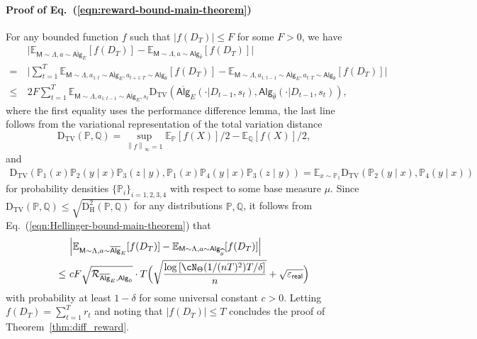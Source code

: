 \documentclass[10pt]{article}
\renewcommand{\epsilon}{\varepsilon}
\newcommand{\norm}[1]{\left\|{#1}\right\|}
\newcommand{\linf}[1]{\norm{#1}_\infty}
\newcommand{\<}{\left\langle}
\renewcommand{\>}{\right\rangle}
\newcommand{\brac}[1]{{\left[ #1 \right]}}
\newcommand{\E}{\mathbb{E}}
\renewcommand{\P}{\mathbb{P}}
\newcommand{\Q}{\mathbb{Q}}
\newcommand{\inst}{{\mathsf{M}}}
\newcommand{\HelDs}{{\mathrm{D}^2_{\mathrm{H}}}}
\newcommand{\VarD}{{\mathrm{D}_{\mathrm{TV}}}}
\newcommand{\state}{{s}}
\newcommand{\action}{{a}}
\newcommand{\reward}{{r}}
\newcommand{\totlen}{{T}}
\newcommand{\sAlg}{{\mathsf{Alg}}}
\newcommand{\osAlg}{\overline{\mathsf{Alg}}}
\newcommand{\dset}{{D}}
\newcommand{\Numobs}{{n}}
\newcommand{\Parspace}{{\Theta}}
\newcommand{\EstPar}{{\widehat{\theta}}}
\newcommand{\prior}{{\Lambda}}
\newcommand{\shortexp}{{E}}
\newcommand{\geneps}{{\epsilon}_{\sf real}}
\newcommand{\distratio}{{\mathcal{R}}}
\def\sP{{\mathbb{P}}}
\def\sQ{{\mathbb{Q}}}
\begin{document}
\paragraph{Proof of Eq.~(\ref{eqn:reward-bound-main-theorem})}
For any bounded function $f$ such that $|f(\dset_\totlen)|\leq F$ for some $F>0$,  we have
\begin{align*}
  &~ \Big| \E_{\inst\sim\prior,\action\sim\osAlg_\shortexp}[f(\dset_\totlen)]-
   \E_{\inst\sim\prior,\action\sim\sAlg_\EstPar}[f(\dset_\totlen)]\Big|
   \\
   =&~
\Big| \sum_{t=1}^\totlen\E_{\inst\sim\prior,\action_{1:t}\sim\osAlg_\shortexp,\action_{t+1:\totlen}\sim\sAlg_\EstPar}[f(\dset_\totlen)]-
\E_{\inst\sim\prior,\action_{1:t-1}\sim\osAlg_{\shortexp},\action_{t:\totlen}\sim\sAlg_\EstPar}[f(\dset_\totlen)]\Big|
   \\
\leq&~
2F\sum_{t=1}^\totlen\E_{\inst\sim\prior,\action_{1:t-1}\sim\osAlg_{\shortexp},\state_t}\VarD(\osAlg_{\shortexp}(\cdot|\dset_{t-1},\state_t),\sAlg_{\EstPar}(\cdot|\dset_{t-1},\state_t)),
\end{align*}
where the first equality uses the performance difference lemma, the last line follows from the variational representation of the total variation distance $$\VarD(\sP,\sQ)=\sup_{\linf{f}=1}\E_\sP[f(X)]/2-\E_\sQ[f(X)]/2,$$  and \begin{align}
\VarD(\sP_1(x)\sP_2(y\mid x)\sP_3(z\mid y),\sP_1(x)\sP_{4}(y\mid x)\sP_3(z\mid y))=\E_{x\sim\sP_1}\VarD(\sP_2(y\mid x),\sP_{4}(y\mid x))\label{eq:kl_telescope}
\end{align}
for probability densities $\{ \P_i\}_{i=1,2,3,4}$ with respect to some base measure $\mu$. Since $\VarD(\P,\Q)\leq\sqrt{\HelDs(\P,\Q)}$ for any distributions $\P,\Q$,  it follows from Eq.~(\ref{eqn:Hellinger-bound-main-theorem}) that
\begin{align*}
 &~ \Big| \E_{\inst\sim\prior,\action\sim\osAlg_{\shortexp}}[f(\dset_\totlen)]-
   \E_{\inst\sim\prior,\action\sim\sAlg_\EstPar}[f(\dset_\totlen)]\Big|\\
  \leq &~cF\sqrt{\distratio_{\osAlg_{\shortexp},\sAlg_0}}\cdot\totlen\Big(\sqrt{\frac{\log \brac{ \cN_{\Parspace}(1/(\Numobs\totlen)^2) \totlen/\delta } }{n}} + \sqrt{\geneps}\Big)
\end{align*}
with probability at least $1-\delta$ for some universal constant $c>0$. Letting $f(\dset_\totlen)=\sum_{t=1}^\totlen\reward_t$  and noting that  $|f(\dset_\totlen)|\leq\totlen$ concludes the proof of Theorem~\ref{thm:diff_reward}.
\end{document}
